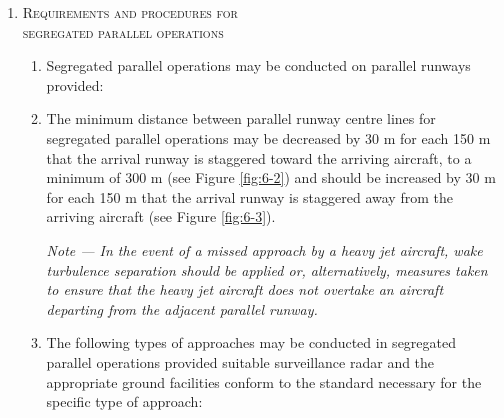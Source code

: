 \documentclass[../main.tex]{subfiles}
\begin{document}
\begin{enumerate}[itemsep=0.2cm]
\begin{enumerate}
        \end{enumerate}

        \item \textsc{Requirements and procedures for \\ segregated parallel operations}
        \begin{enumerate}
            \item \label{6.7.3.5.1} Segregated parallel operations may be conducted on parallel runways provided:


            \item \label{6.7.3.5.2} The minimum distance between parallel runway centre lines for segregated parallel operations may be decreased by 30 m for each 150 m that the arrival runway is staggered toward the arriving aircraft, to a minimum of 300 m (see Figure \ref{fig:6-2}) and should be increased by 30 m for each 150 m that the arrival runway is staggered away from the arriving aircraft (see Figure \ref{fig:6-3}).

            \textit{Note --- In the event of a missed approach by a heavy jet aircraft, wake turbulence separation should be applied or, alternatively, measures taken to ensure that the heavy jet aircraft does not overtake an aircraft departing from the adjacent parallel runway.}

            
            
            \item The following types of approaches may be conducted in segregated parallel operations provided suitable surveillance radar and the appropriate ground facilities conform to the standard necessary for the specific type of approach:


\end{enumerate}
\end{enumerate}
\end{document}
